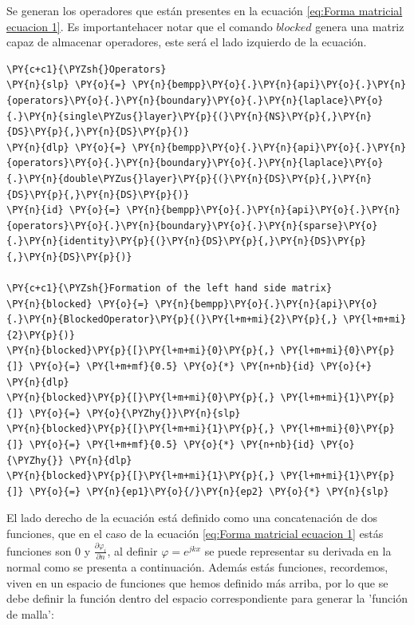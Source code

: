 Se generan los operadores que están presentes en la ecuación \eqref{eq:Forma matricial ecuacion 1}. Es importantehacer notar que el comando $blocked$ genera una matriz capaz de almacenar operadores, este será el lado izquierdo de la ecuación.
\begin{tcolorbox}
\begin{Verbatim}[commandchars=\\\{\}]
\PY{c+c1}{\PYZsh{}Operators}
\PY{n}{slp} \PY{o}{=} \PY{n}{bempp}\PY{o}{.}\PY{n}{api}\PY{o}{.}\PY{n}{operators}\PY{o}{.}\PY{n}{boundary}\PY{o}{.}\PY{n}{laplace}\PY{o}{.}\PY{n}{single\PYZus{}layer}\PY{p}{(}\PY{n}{NS}\PY{p}{,}\PY{n}{DS}\PY{p}{,}\PY{n}{DS}\PY{p}{)}
\PY{n}{dlp} \PY{o}{=} \PY{n}{bempp}\PY{o}{.}\PY{n}{api}\PY{o}{.}\PY{n}{operators}\PY{o}{.}\PY{n}{boundary}\PY{o}{.}\PY{n}{laplace}\PY{o}{.}\PY{n}{double\PYZus{}layer}\PY{p}{(}\PY{n}{DS}\PY{p}{,}\PY{n}{DS}\PY{p}{,}\PY{n}{DS}\PY{p}{)}        
\PY{n}{id} \PY{o}{=} \PY{n}{bempp}\PY{o}{.}\PY{n}{api}\PY{o}{.}\PY{n}{operators}\PY{o}{.}\PY{n}{boundary}\PY{o}{.}\PY{n}{sparse}\PY{o}{.}\PY{n}{identity}\PY{p}{(}\PY{n}{DS}\PY{p}{,}\PY{n}{DS}\PY{p}{,}\PY{n}{DS}\PY{p}{)}
                
\PY{c+c1}{\PYZsh{}Formation of the left hand side matrix}
\PY{n}{blocked} \PY{o}{=} \PY{n}{bempp}\PY{o}{.}\PY{n}{api}\PY{o}{.}\PY{n}{BlockedOperator}\PY{p}{(}\PY{l+m+mi}{2}\PY{p}{,} \PY{l+m+mi}{2}\PY{p}{)}
\PY{n}{blocked}\PY{p}{[}\PY{l+m+mi}{0}\PY{p}{,} \PY{l+m+mi}{0}\PY{p}{]} \PY{o}{=} \PY{l+m+mf}{0.5} \PY{o}{*} \PY{n+nb}{id} \PY{o}{+} \PY{n}{dlp}
\PY{n}{blocked}\PY{p}{[}\PY{l+m+mi}{0}\PY{p}{,} \PY{l+m+mi}{1}\PY{p}{]} \PY{o}{=} \PY{o}{\PYZhy{}}\PY{n}{slp}
\PY{n}{blocked}\PY{p}{[}\PY{l+m+mi}{1}\PY{p}{,} \PY{l+m+mi}{0}\PY{p}{]} \PY{o}{=} \PY{l+m+mf}{0.5} \PY{o}{*} \PY{n+nb}{id} \PY{o}{\PYZhy{}} \PY{n}{dlp}
\PY{n}{blocked}\PY{p}{[}\PY{l+m+mi}{1}\PY{p}{,} \PY{l+m+mi}{1}\PY{p}{]} \PY{o}{=} \PY{n}{ep1}\PY{o}{/}\PY{n}{ep2} \PY{o}{*} \PY{n}{slp}
\end{Verbatim}
\end{tcolorbox}
El lado derecho de la ecuación está definido como una concatenación de dos funciones, que en el caso de la ecuación \eqref{eq:Forma matricial ecuacion 1} estás funciones son $0$ y $\frac{\partial \varphi_i}{\partial n}$, al definir $\varphi=e^{jkx}$ se puede representar su derivada en la normal como se presenta a continuación. Además estás funciones, recordemos, viven en un espacio de funciones que hemos definido más arriba, por lo que se debe definir la función dentro del espacio correspondiente para generar la 'función de malla':
